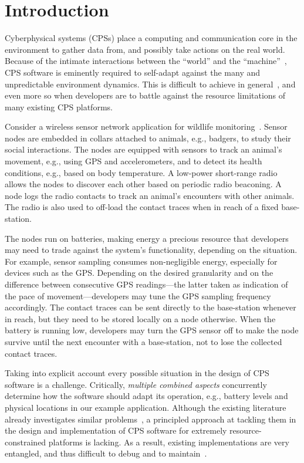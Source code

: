 \section{Introduction}

Cyberphysical systems (CPSs) place a computing and communication core
in the environment to gather data from, and possibly take actions on
the real world. Because of the intimate interactions between the
``world'' and the ``machine''~\cite{Jackson:1995:WM:225014.225041},
CPS software is eminently required to self-adapt against the many and
unpredictable environment dynamics. This is difficult to achieve in
general~\cite{cheng:adaptive}, and even more so when developers are to
battle against the resource limitations of many existing CPS
platforms.

 Consider a wireless sensor network application for
wildlife monitoring~\cite{pasztor10:selective}.  Sensor nodes are
embedded in collars attached to animals, e.g., badgers, to study their
social interactions. The nodes are equipped with sensors to track an
animal's movement, e.g., using GPS and accelerometers, and to detect
its health conditions, e.g., based on body temperature.  A low-power
short-range radio allows the nodes to discover each other based on
periodic radio beaconing.  A node logs the radio contacts to track an
animal's encounters with other animals. The radio is also used to
off-load the contact traces when in reach of a fixed base-station.

The nodes run on batteries, making energy a precious resource that
developers may need to trade against the system's functionality,
depending on the situation. For example, sensor sampling consumes
non-negligible energy, especially for devices such as the
GPS. Depending on the desired granularity and on the difference
between consecutive GPS readings---the latter taken as indication of
the pace of movement---developers may tune the GPS sampling frequency
accordingly. The contact traces can be sent directly to the
base-station whenever in reach, but they need to be stored locally on
a node otherwise.  When the battery is running low, developers may
turn the GPS sensor off to make the node survive until the next
encounter with a base-station, not to lose the collected contact
traces.

 Taking into explicit account every
possible situation in the design of CPS software is a
challenge. Critically, \emph{multiple combined aspects} concurrently
determine how the software should adapt its operation, e.g., battery
levels and physical locations in our example application. Although the
existing literature already investigates similar
problems~\cite{cheng:adaptive}, a principled approach at tackling them
in the design and implementation of CPS software for extremely
resource-constrained platforms is lacking. As a result, existing
implementations are very entangled, and thus difficult to debug and to
maintain~\cite{Picco:2010:SEW:1882362.1882421}.

